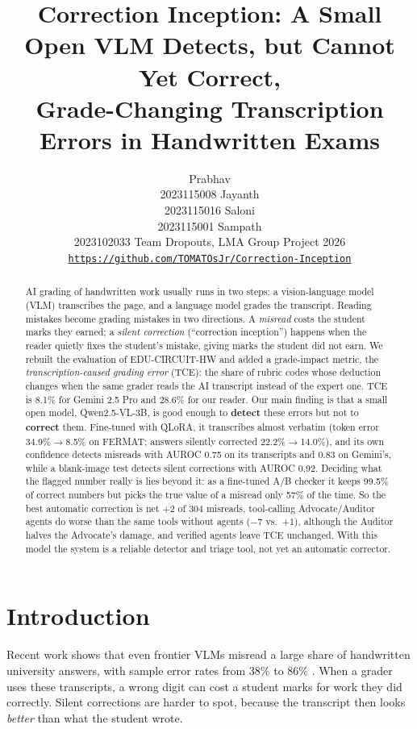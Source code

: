 \documentclass[11pt]{article}
\title{Correction Inception: A Small Open VLM Detects, but Cannot Yet Correct,\\Grade-Changing Transcription Errors in Handwritten Exams}
\author{Prabhav \\ 2023115008 \And Jayanth \\ 2023115016 \And Saloni \\ 2023115001 \And Sampath \\ 2023102033 \AND
  Team Dropouts, LMA Group Project 2026 \\
  \texttt{\url{https://github.com/TOMATOsJr/Correction-Inception}}}
\newcommand{\ra}{$\rightarrow$}
\begin{document}
\maketitle

\begin{abstract}
AI grading of handwritten work usually runs in two steps: a vision-language model (VLM) transcribes the page, and a language model grades the transcript. Reading mistakes become grading mistakes in two directions. A \emph{misread} costs the student marks they earned; a \emph{silent correction} (``correction inception'') happens when the reader quietly fixes the student's mistake, giving marks the student did not earn. We rebuilt the evaluation of EDU-CIRCUIT-HW and added a grade-impact metric, the \emph{transcription-caused grading error} (TCE): the share of rubric codes whose deduction changes when the same grader reads the AI transcript instead of the expert one. TCE is 8.1\% for Gemini 2.5 Pro and 28.6\% for our reader. Our main finding is that a small open model, Qwen2.5-VL-3B, is good enough to \textbf{detect} these errors but not to \textbf{correct} them. Fine-tuned with QLoRA, it transcribes almost verbatim (token error 34.9\%\ra8.5\% on FERMAT; answers silently corrected 22.2\%\ra14.0\%), and its own confidence detects misreads with AUROC 0.75 on its transcripts and 0.83 on Gemini's, while a blank-image test detects silent corrections with AUROC 0.92. Deciding what the flagged number really is lies beyond it: as a fine-tuned A/B checker it keeps 99.5\% of correct numbers but picks the true value of a misread only 57\% of the time. So the best automatic correction is net $+2$ of 304 misreads, tool-calling Advocate/Auditor agents do worse than the same tools without agents ($-7$ vs.\ $+1$), although the Auditor halves the Advocate's damage, and verified agents leave TCE unchanged. With this model the system is a reliable detector and triage tool, not yet an automatic corrector.
\end{abstract}

\section{Introduction}

Recent work shows that even frontier VLMs misread a large share of handwritten university answers, with sample error rates from 38\% to 86\% \citep{educircuit2026}. When a grader uses these transcripts, a wrong digit can cost a student marks for work they did correctly. Silent corrections are harder to spot, because the transcript then looks \emph{better} than what the student wrote.
\end{document}
